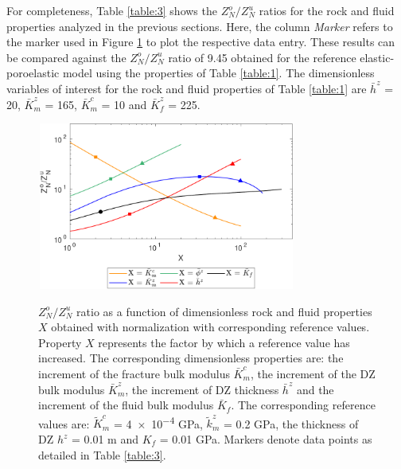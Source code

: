 \documentclass[draft]{agujournal2019}
\begin{document}
For completeness, Table \ref{table:3} shows the $Z_N^o/Z_N^u$  ratios for the rock and fluid properties analyzed in the previous sections. Here, the column \emph{Marker} refers to the marker used in Figure \ref{fig:10} to plot the respective data entry.
These results can be compared against the  $Z_N^o/Z_N^u$ ratio  of 9.45 obtained for the reference elastic-poroelastic model using the properties of Table \ref{table:1}. The dimensionless variables of interest for the rock and fluid properties of Table \ref{table:1} are $\bar{h}^z$ = 20, $\bar{K}_m^z$ = 165, $\bar{K}_m^c$ = 10 and $\bar{K}_f^z$ = 225.

\begin{figure}
\centering
      {
        \includegraphics[width=85mm, height=55mm]{figures/zno_znu_sensitivity.pdf}
        }
        
\caption { $Z_N^o / Z_N^u$ ratio as a function of dimensionless rock and fluid properties $X$ obtained with normalization with corresponding reference values. Property $X$ represents the factor by which a reference value has increased. The corresponding dimensionless properties are: the increment of the fracture bulk modulus $\bar{K}_m^c$, the increment of the DZ bulk modulus $\bar{K}_m^z$, the increment of DZ thickness $\bar{h}^z$ and the increment of the fluid bulk modulus $\bar{K}_f$. The corresponding reference values are:  $\tilde{K}_m^c$ = \num{4e-4} GPa,  $\tilde{k}_m^z$ = 0.2 GPa, the thickness of DZ $ h^z$ = 0.01 m and $ K_f$ = 0.01 GPa. Markers denote data points as detailed in Table \ref{table:3}.
}
\label{fig:10}
\end{figure}
\end{document}
